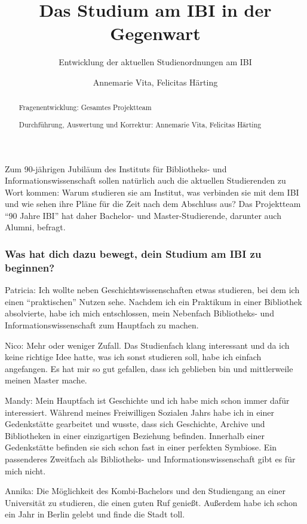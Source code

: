 \documentclass[a4paper,
fontsize=11pt,
oneside,
numbers=noperiodatend,
parskip=half-,
bibliography=totoc,
final
]{scrartcl}
\title{\LARGE{Das Studium am IBI in der Gegenwart}}%
\subtitle{Entwicklung der aktuellen Studienordnungen am IBI}
\author{Annemarie Vita, Felicitas Härting} %
\date{}
\begin{document}
\maketitle
\thispagestyle{fancyplain} 

\begin{abstract}
Fragenentwicklung: Gesamtes Projektteam

Durchführung, Auswertung und Korrektur: Annemarie Vita, Felicitas
Härting
\end{abstract}

Zum 90-jährigen Jubiläum des Instituts für Bibliotheks- und
Informationswissenschaft sollen natürlich auch die aktuellen
Studierenden zu Wort kommen: Warum studieren sie am Institut, was
verbinden sie mit dem IBI und wie sehen ihre Pläne für die Zeit nach dem
Abschluss aus? Das Projektteam \enquote{90 Jahre IBI} hat daher
Bachelor- und Master-Studierende, darunter auch Alumni, befragt.

\hypertarget{was-hat-dich-dazu-bewegt-dein-studium-am-ibi-zu-beginnen}{%
\subsubsection{Was hat dich dazu bewegt, dein Studium am IBI zu
beginnen?}\label{was-hat-dich-dazu-bewegt-dein-studium-am-ibi-zu-beginnen}}

Patricia: Ich wollte neben Geschichtswissenschaften etwas studieren, bei
dem ich einen \enquote{praktischen} Nutzen sehe. Nachdem ich ein
Praktikum in einer Bibliothek absolvierte, habe ich mich entschlossen,
mein Nebenfach Bibliotheks- und Informationswissenschaft zum Hauptfach
zu machen.

Nico: Mehr oder weniger Zufall. Das Studienfach klang interessant und da
ich keine richtige Idee hatte, was ich sonst studieren soll, habe ich
einfach angefangen. Es hat mir so gut gefallen, dass ich geblieben bin
und mittlerweile meinen Master mache.

Mandy: Mein Hauptfach ist Geschichte und ich habe mich schon immer dafür
interessiert. Während meines Freiwilligen Sozialen Jahrs habe ich in
einer Gedenkstätte gearbeitet und wusste, dass sich Geschichte, Archive
und Bibliotheken in einer einzigartigen Beziehung befinden. Innerhalb
einer Gedenkstätte befinden sie sich schon fast in einer perfekten
Symbiose. Ein passenderes Zweitfach als Bibliotheks- und
Informationswissenschaft gibt es für mich nicht.

Annika: Die Möglichkeit des Kombi-Bachelors und den Studiengang an einer
Universität zu studieren, die einen guten Ruf genießt. Außerdem habe ich
schon ein Jahr in Berlin gelebt und finde die Stadt toll.
\end{document}
